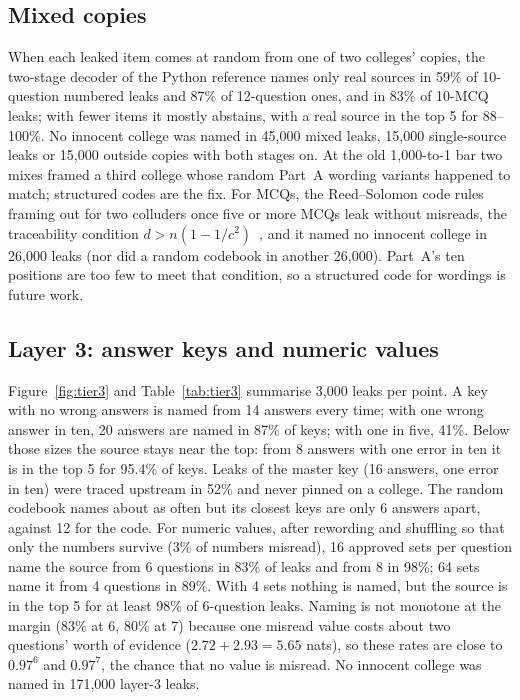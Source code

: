 \documentclass[10pt,a4paper]{article}
\theoremstyle{remark}
\begin{document}
\subsection{Mixed copies}
When each leaked item comes at random from one of two colleges' copies, the two-stage decoder of the Python reference names only real sources in 59\% of 10-question numbered leaks and 87\% of 12-question ones, and in 83\% of 10-MCQ leaks; with fewer items it mostly abstains, with a real source in the top 5 for 88--100\%. No innocent college was named in 45{,}000 mixed leaks, 15{,}000 single-source leaks or 15{,}000 outside copies with both stages on. At the old 1{,}000-to-1 bar two mixes framed a third college whose random Part~A wording variants happened to match; structured codes are the fix. For MCQs, the Reed--Solomon code rules framing out for two colluders once five or more MCQs leak without misreads, the traceability condition $d>n(1-1/c^2)$~\citep{staddon2001}, and it named no innocent college in 26{,}000 leaks (nor did a random codebook in another 26{,}000). Part~A's ten positions are too few to meet that condition, so a structured code for wordings is future work.

\subsection{Layer 3: answer keys and numeric values}
Figure~\ref{fig:tier3} and Table~\ref{tab:tier3} summarise 3{,}000 leaks per point. A key with no wrong answers is named from 14 answers every time; with one wrong answer in ten, 20 answers are named in 87\% of keys; with one in five, 41\%. Below those sizes the source stays near the top: from 8 answers with one error in ten it is in the top 5 for 95.4\% of keys. Leaks of the master key (16 answers, one error in ten) were traced upstream in 52\% and never pinned on a college. The random codebook names about as often but its closest keys are only 6 answers apart, against 12 for the code. For numeric values, after rewording and shuffling so that only the numbers survive (3\% of numbers misread), 16 approved sets per question name the source from 6 questions in 83\% of leaks and from 8 in 98\%; 64 sets name it from 4 questions in 89\%. With 4 sets nothing is named, but the source is in the top 5 for at least 98\% of 6-question leaks. Naming is not monotone at the margin (83\% at 6, 80\% at 7) because one misread value costs about two questions' worth of evidence ($2.72+2.93=5.65$ nats), so these rates are close to $0.97^6$ and $0.97^7$, the chance that no value is misread. No innocent college was named in 171{,}000 layer-3 leaks.
\end{document}
